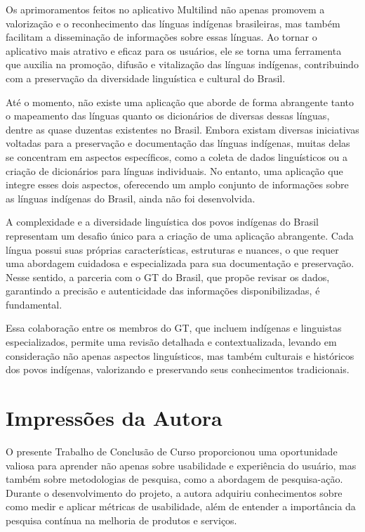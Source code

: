 Os aprimoramentos feitos no aplicativo Multilind não apenas promovem a valorização e o reconhecimento das línguas indígenas brasileiras, mas também facilitam a disseminação de informações sobre 
essas línguas. Ao tornar o aplicativo mais atrativo e eficaz para os usuários, ele se torna uma ferramenta que auxilia na promoção, difusão e vitalização das línguas indígenas, contribuindo com 
a preservação da diversidade linguística e cultural do Brasil.

Até o momento, não existe uma aplicação que aborde de forma abrangente tanto o mapeamento das línguas quanto os dicionários de diversas dessas línguas, dentre as quase duzentas existentes no Brasil. Embora 
existam diversas iniciativas voltadas para a preservação e documentação das línguas indígenas, muitas delas se concentram em aspectos específicos, como a coleta de dados linguísticos ou a criação de 
dicionários para línguas individuais. No entanto, uma aplicação que integre esses dois aspectos, oferecendo um amplo conjunto de informações sobre as línguas indígenas do Brasil, ainda não foi desenvolvida.

A complexidade e a diversidade linguística dos povos indígenas do Brasil representam um desafio único para a criação de uma aplicação abrangente. Cada língua possui suas próprias características, estruturas 
e nuances, o que requer uma abordagem cuidadosa e especializada para sua documentação e preservação. Nesse sentido, a parceria com o GT do Brasil, que propõe revisar os dados, garantindo a precisão e autenticidade 
das informações disponibilizadas, é fundamental. 

Essa colaboração entre os membros do GT, que incluem indígenas e linguistas especializados, permite uma revisão detalhada e contextualizada, levando em consideração não apenas aspectos linguísticos, mas também 
culturais e históricos dos povos indígenas, valorizando e preservando seus conhecimentos tradicionais.

\section{Impressões da Autora}
\label{sec:Impressões da Autora}
O presente Trabalho de Conclusão de Curso proporcionou uma oportunidade valiosa para aprender não apenas sobre usabilidade e experiência do usuário, mas também sobre metodologias de pesquisa, como a abordagem de pesquisa-ação. 
Durante o desenvolvimento do projeto, a autora adquiriu conhecimentos sobre como medir e aplicar métricas de usabilidade, além de entender a importância da pesquisa contínua na melhoria de produtos e serviços. 

